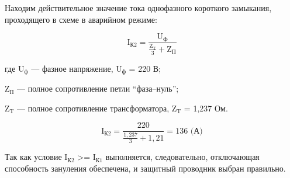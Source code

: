 Находим действительное значение тока однофазного короткого замыкания, проходящего в схеме в аварийном режиме:

\begin{displaymath}
  \text{I}_\text{К2} = \frac{\text{U}_\text{Ф}}{\frac{\text{Z}_\text{T}}{3}+\text{Z}_\text{П}}
\end{displaymath}

где \(\text{U}_\text{ф}\) --- фазное напряжение, \(\text{U}_\text{ф}\) = 220 В;

\(\text{Z}_\text{П}\) --- полное сопротивление петли “фаза–нуль”;

\(\text{Z}_\text{T}\) --- полное сопротивление трансформатора, \(\text{Z}_\text{T}\) = 1,237 Ом.

\begin{displaymath}
  \text{I}_\text{К2} = \frac{220}{\frac{1,237}{3}+1,21} = 136 \text{ (А)}
\end{displaymath}

Так как условие \(\text{I}_\text{К2}\) >= \(\text{I}_\text{К1}\) выполняется, следовательно, отключающая способность зануления обеспечена, и защитный проводник выбран правильно.

\newpage